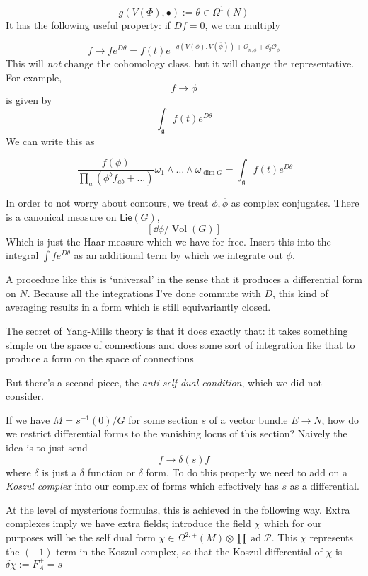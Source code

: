 \documentclass[leqno, openany]{memoir}
\theoremstyle{definition}
\theoremstyle{remark}
\theoremstyle{plain}
\theoremstyle{definition}
\theoremstyle{remark}
\newcommand{\ms}[1]{\mathsf{#1}}
\newcommand{\on}[1]{\operatorname{#1}}
\DeclareMathOperator{\ad}{ad}
\begin{document}
\[
g(V(\Phi),\bullet) := \theta \in \Omega^{1}(N)
\]
It has the following useful property: if $Df =0$, we can multiply

\[
f \to f e^{D\theta} = f(t) e^{-g(V(\phi), V(\overline{\phi})) + \mathcal{O}_{n, \overline{\phi}} + \dd_{g} \mathcal{O}_{\overline{\phi}} }
\]
This will \emph{not} change the cohomology class, but it will change the representative.  For example,
\[
f \to \phi
\]
is given by
\[
\int_{\mathfrak{g}} f(t) e^{D\theta}
\]
We can write this as

\[
\ \frac{f(\phi)}{\prod_{a}(\phi^{b}f_{ab} + \dots)}\overline{\omega}_{1} \wedge \dots \wedge \overline{\omega}_{\dim G} = \int_{\mathfrak{g}} f(t) e^{D\theta}
\]

In order to not worry about contours, we treat $\phi, \overline{\phi}$ as complex conjugates. There is a canonical measure on $\ms{Lie}(G)$,
\[
[\dd\phi/\on{Vol}(G)]
\]
Which is just the Haar measure which we have for free. Insert this into the integral $\int fe^{D\theta}$ as an additional term by which we integrate out $\phi$.

A procedure like this is `universal' in the sense that it produces a differential form on $N$. Because all the integrations I've done commute with $D$, this kind of averaging results in a form which is still equivariantly closed.


The secret of Yang-Mills theory is that it does exactly that: it takes something simple on the space of connections and does some sort of integration like that to produce a form on the space of connections

But there's a second piece, the \emph{anti self-dual condition}, which we did not consider.

If we have $M = s^{-1}(0)/G$ for some section $s$ of a vector bundle $E \to N$, how do we restrict differential forms to the vanishing locus of this section? Naively the idea is to just send
\[
f \to \delta(s) f
\]
where $\delta$ is just a $\delta$ function or $\delta$ form.  To do this properly we need to add on a \emph{Koszul complex} into our complex of forms which effectively has $s$ as a differential.

At the level of mysterious formulas, this is achieved in the following way. Extra complexes imply we have extra fields; introduce the field $\chi$ which for our purposes will be the self dual form $\chi \in \Omega^{2,+}(M) \otimes \prod \ad\mathcal{P}$. This $\chi$ represents the $(-1)$ term in the Koszul complex, so that the Koszul differential of $\chi$ is $\delta \chi := F_{A}^{+} = s$
\end{document}
